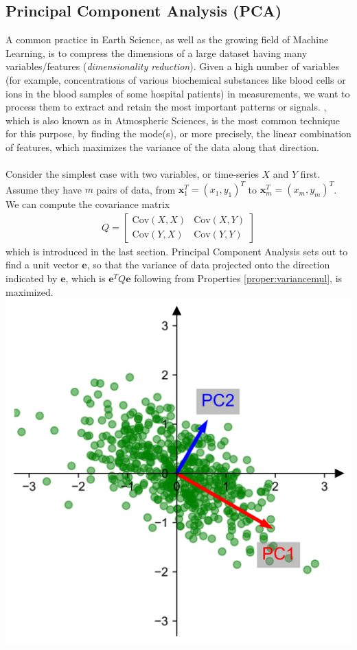 \subsection{Principal Component Analysis (PCA)}
\label{subsection:PCA}
A common practice in Earth Science, as well as the growing field of Machine Learning, is to compress the dimensions of a large dataset having many variables/features (\textit{dimensionality reduction}). Given a high number of variables (for example, concentrations of various biochemical substances like blood cells or ions in the blood samples of some hospital patients) in measurements, we want to process them to extract and retain the most important patterns or signals. , which is also known as  in Atmospheric Sciences, is the most common technique for this purpose, by finding the mode(s), or more precisely, the linear combination of features, which maximizes the variance of the data along that direction. \\
\\
Consider the simplest case with two variables, or time-series $X$ and $Y$ first. Assume they have $m$ pairs of data, from $\textbf{x}_1^T = (x_1, y_1)^T$ to $\textbf{x}_m^T = (x_{m}, y_{m})^T$. We can compute the covariance matrix
\begin{align*}
Q = \begin{bmatrix}
\text{Cov}(X, X) & \text{Cov}(X, Y) \\
\text{Cov}(Y, X) & \text{Cov}(Y, Y) 
\end{bmatrix}
\end{align*}
which is introduced in the last section. Principal Component Analysis sets out to find a unit vector $\textbf{e}$, so that the variance of data projected onto the direction indicated by $\textbf{e}$, which is $\textbf{e}^T Q \textbf{e}$ following from Properties \ref{proper:variancemul}, is maximized.
\includegraphics{graphics/PCA_first_demo.png}\\
